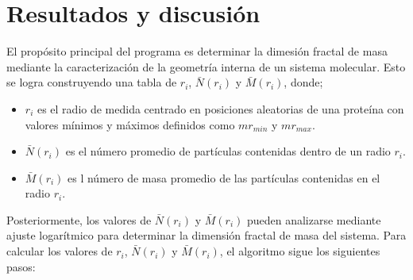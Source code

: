 \chapter{Resultados y discusión}

El propósito principal del programa es determinar la dimesi\'{o}n fractal de masa mediante la caracterizaci\'{o}n de la geometría interna de un sistema molecular. Esto se logra construyendo una tabla de \(r_i\), \( \bar{N}(r_i)\) y \( \bar{M}(r_i)\), donde;

\begin{itemize}
	\item \(r_i\) es el radio de medida centrado en posiciones aleatorias de una prote\'{i}na con valores m\'{i}nimos y m\'{a}ximos definidos como \(mr_{min}\) y \(mr_{max}\).
	\item \( \bar{N}(r_i)\) es el número promedio de partículas contenidas dentro de un radio \(r_i\). 
	\item  \( \bar{M}(r_i)\) es l n\'{u}mero de masa promedio de las part\'{i}culas contenidas en el radio \(r_i\).
\end{itemize}

Posteriormente, los valores de \( \bar{N}(r_i) \) y \( \bar{M}(r_i)\) pueden analizarse mediante ajuste logarítmico para determinar la dimensión fractal de masa del sistema. Para calcular los valores de \(r_i\), \( \bar{N}(r_i)\) y \( \bar{M}(r_i)\), el algoritmo sigue los siguientes pasos:


